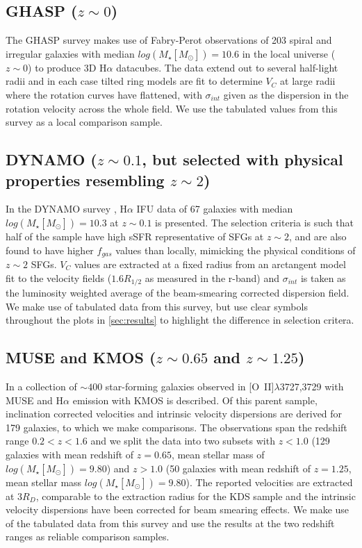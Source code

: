 \documentclass[fleqn,usenatbib]{mn2e}
\begin{document}
\subsection{GHASP ($z\sim0$)}\label{subsec:GHASP}
The GHASP survey \citep[E08]{Epinat2008,Epinat2008a} makes use of Fabry-Perot observations of 203 spiral and irregular galaxies with median $log(M_{\star}[M_{\odot}])=10.6$ in the local universe ($z\sim0$) to produce 3D H$\alpha$ datacubes.
The data extend out to several half-light radii and in each case tilted ring models are fit to determine $V_{C}$ at large radii where the rotation curves have flattened, with $\sigma_{int}$ given as the dispersion in the rotation velocity across the whole field.
We use the tabulated values from this survey as a local comparison sample.

\subsection{DYNAMO ($z\sim0.1$, but selected with physical properties resembling $z\sim2$)}\label{subsec:DYNAMO}
In the DYNAMO survey \citep[G14]{Green2014}, H$\alpha$ IFU data of 67 galaxies with median $log(M_{\star}[M_{\odot}])=10.3$ at $z\sim0.1$ is presented.
The selection criteria is such that half of the sample have high sSFR representative of SFGs at $z\sim 2$, and are also found to have higher $f_{gas}$ values than locally, mimicking the physical conditions of $z\sim 2$ SFGs.
$V_{C}$ values are extracted at a fixed radius from an arctangent model fit to the velocity fields ($1.6R_{1/2}$ as measured in the r-band) and $\sigma_{int}$ is taken as the luminosity weighted average of the beam-smearing corrected dispersion field.
We make use of tabulated data from this survey, but use clear symbols throughout the plots in \cref{sec:results} to highlight the difference in selection critera.

\subsection{MUSE and KMOS ($z\sim0.65$ and $z\sim1.25$)}\label{subsec:MUSE_and_KMOS}
In \cite{Swinbank2017} a collection of $\sim400$ star-forming galaxies observed in [O~{\sc II}]$\lambda$3727,3729 with MUSE and H$\alpha$ emission with KMOS is described.
Of this parent sample, inclination corrected velocities and intrinsic velocity dispersions are derived for 179 galaxies, to which we make comparisons.
The observations span the redshift range $0.2 < z < 1.6$ and we split the data into two subsets with $z < 1.0$ (129 galaxies with mean redshift of $z = 0.65$, mean stellar mass of $log(M_{\star}[M_{\odot}])=9.80$) and $z > 1.0$ (50 galaxies with mean redshift of $z = 1.25$, mean stellar mass $log(M_{\star}[M_{\odot}])=9.80$).
The reported velocities are extracted at $3R_{D}$, comparable to the extraction radius for the KDS sample and the intrinsic velocity dispersions have been corrected for beam smearing effects.
We make use of the tabulated data from this survey and use the results at the two redshift ranges as reliable comparison samples.
\end{document}
